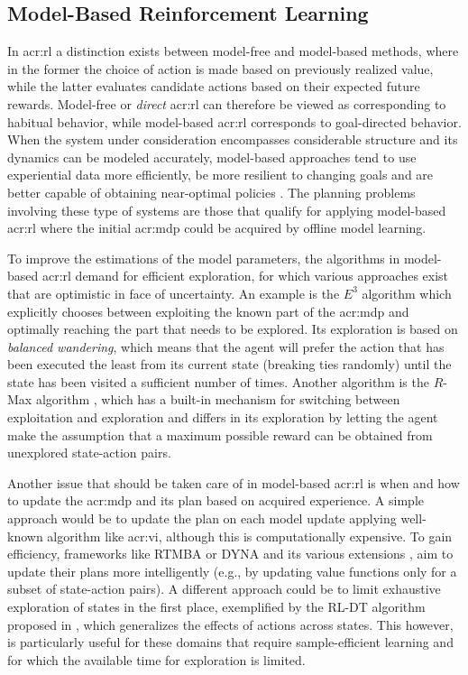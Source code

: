\subsection{Model-Based Reinforcement Learning}
\label{sec:model-based-reinforcement-learning}

In \acrshort{acr:rl} a distinction exists between model-free and model-based methods, where in the former the choice of action is made based on previously realized value, while the latter evaluates candidate actions based on their expected future rewards.
Model-free or \textit{direct} \acrshort{acr:rl} can therefore be viewed as corresponding to habitual behavior, while model-based \acrshort{acr:rl} corresponds to goal-directed behavior.
When the system under consideration encompasses considerable structure and its dynamics can be modeled accurately, model-based approaches tend to use experiential data more efficiently, be more resilient to changing goals and are better capable of obtaining near-optimal policies \cite{atkeson1997}.
The planning problems involving these type of systems are those that qualify for applying model-based \acrshort{acr:rl} where the initial \acrshort{acr:mdp} could be acquired by offline model learning.

To improve the estimations of the model parameters, the algorithms in model-based \acrshort{acr:rl} demand for efficient exploration, for which various approaches exist that are optimistic in face of uncertainty.
An example is the $E^3$ algorithm \cite{kearns2002near} which explicitly chooses between exploiting the known part of the \acrshort{acr:mdp} and optimally reaching the part that needs to be explored. 
Its exploration is based on \textit{balanced wandering}, which means that the agent will prefer the action that has been executed the least from its current state (breaking ties randomly) until the state has been visited a sufficient number of times.
Another algorithm is the $R$-Max algorithm \cite{Brafman2002}, which has a built-in mechanism for switching between exploitation and exploration and differs in its exploration by letting the agent make the assumption that a maximum possible reward can be obtained from unexplored state-action pairs.

Another issue that should be taken care of in model-based \acrshort{acr:rl} is when and how to update the \acrshort{acr:mdp} and its plan based on acquired experience. A simple approach would be to update the plan on each model update applying well-known algorithm like \acrshort{acr:vi}, although this is computationally expensive.
To gain efficiency, frameworks like \textsc{RTMBA} \cite{hester2012rtmba} or \textsc{DYNA} and its various extensions \cite{silver2008sample}, aim to update their plans more intelligently (e.g., by updating value functions only for a subset of state-action pairs).
A different approach could be to limit exhaustive exploration of states in the first place, exemplified by the \textsc{RL-DT} algorithm proposed in \cite{hester2010generalized}, which generalizes the effects of actions across states.
This however, is particularly useful for these domains that require sample-efficient learning and for which the available time for exploration is limited.

